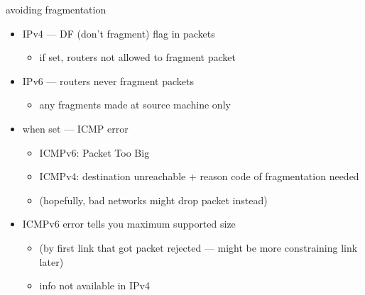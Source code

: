 \begin{frame}{avoiding fragmentation}
    \begin{itemize}
    \item IPv4 --- DF (don't fragment) flag in packets
        \begin{itemize}
        \item if set, routers not allowed to fragment packet
        \end{itemize}
    \item IPv6 --- routers never fragment packets
        \begin{itemize}
        \item any fragments made at source machine only
        \end{itemize}
    \vspace{.5cm}
    \item<2-> when set --- ICMP error
        \begin{itemize}
        \item ICMPv6: Packet Too Big
        \item ICMPv4: destination unreachable + reason code of fragmentation needed
        \item (hopefully, bad networks might drop packet instead)
        \end{itemize}
    \item<2-> ICMPv6 error tells you maximum supported size
        \begin{itemize}
        \item (by first link that got packet rejected --- might be more constraining link later)
        \item info not available in IPv4
        \end{itemize}
    \end{itemize}
\end{frame}
